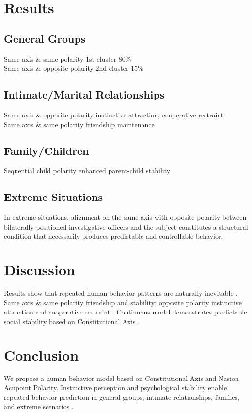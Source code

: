 \documentclass[12pt,a4paper]{article}
\begin{document}
\section{Results}
\subsection{General Groups}
Same axis \& same polarity 1st cluster 80\% \cite{Yoon2026c} \\
Same axis \& opposite polarity 2nd cluster 15\% \cite{Yoon2026c}

\subsection{Intimate/Marital Relationships}
Same axis \& opposite polarity instinctive attraction, cooperative restraint \cite{Yoon2026a} \\
Same axis \& same polarity friendship maintenance \cite{Yoon2026a}

\subsection{Family/Children}
Sequential child polarity enhanced parent-child stability \cite{Yoon2026a}

\subsection{Extreme Situations}
In extreme situations, alignment on the same axis with opposite polarity between bilaterally positioned investigative officers and the subject constitutes a structural condition that necessarily produces predictable and controllable behavior. \cite{Yoon2026b}

\section{Discussion}
Results show that repeated human behavior patterns are naturally inevitable \cite{Yoon2026c}. Same axis \& same polarity friendship and stability; opposite polarity instinctive attraction and cooperative restraint \cite{Yoon2026a}. Continuous model demonstrates predictable social stability based on Constitutional Axis \cite{Yoon2026b}.

\section{Conclusion}
We propose a human behavior model based on Constitutional Axis and Nasion Acupoint Polarity. Instinctive perception and psychological stability enable repeated behavior prediction in general groups, intimate relationships, families, and extreme scenarios \cite{Yoon2026a,Yoon2026b,Yoon2026c}.
\end{document}
